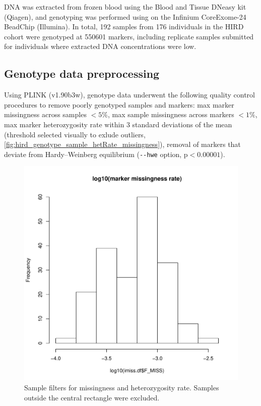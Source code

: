 DNA was extracted from frozen blood using the Blood and Tissue DNeasy kit (Qiagen), and genotyping was performed using on the Infinium CoreExome-24 BeadChip (Illumina).
In total, 192 samples from 176 individuals in the HIRD cohort were genotyped at 550601 markers, including replicate samples submitted for individuals where extracted DNA concentrations were low.

\subsection{Genotype data preprocessing}

Using PLINK (v1.90b3w), genotype data underwent the following quality control procedures to remove poorly genotyped samples and markers:
max marker missingness across samples $< 5\%$, 
max sample missingness across markers $< 1\%$, 
max marker heterozygosity rate within 3 standard deviations of the mean (threshold selected visually to exlude outliers, \autoref{fig:hird_genotype_sample_hetRate_missingness}),
removal of markers that deviate from Hardy–Weinberg equilibrium (\texttt{-{}-hwe} option, $\text{p} < 0.00001$).

\begin{figure}
    \includegraphics[width=1.0\textwidth,page=2]{mainmatter/figures/chapter_02/coreex_eQTLflu_20171204.gencall.smajor.impute_sex.qc2.pdf}
    \caption{Sample filters for missingness and heterozygosity rate. Samples outside the central rectangle were excluded.}
    \label{fig:hird_genotype_sample_hetRate_missingness}
\end{figure}

